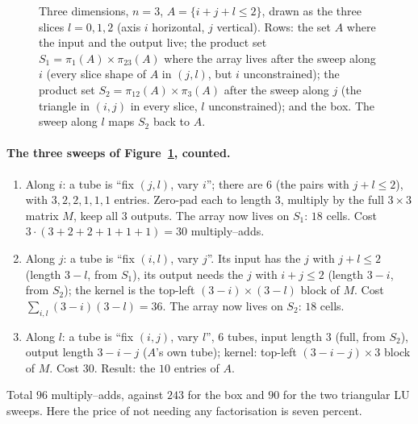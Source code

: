 \documentclass[11pt]{article}
\newcommand{\pr}[1]{\pi_{#1}}
\begin{document}
\begin{figure}[ht]
\caption{Three dimensions, $n=3$, $A=\{i+j+l\le2\}$, drawn as the three slices $l=0,1,2$ (axis $i$ horizontal, $j$ vertical).
Rows: the set $A$ where the input and the output live; the product set $S_1=\pr{1}(A)\times\pr{23}(A)$ where the array lives
after the sweep along $i$ (every slice shape of $A$ in $(j,l)$, but $i$ unconstrained); the product set
$S_2=\pr{12}(A)\times\pr{3}(A)$ after the sweep along $j$ (the triangle in $(i,j)$ in every slice, $l$ unconstrained); and the box.
The sweep along $l$ maps $S_2$ back to $A$.}\label{fig:3d}
\end{figure}

\paragraph{The three sweeps of Figure~\ref{fig:3d}, counted.}
\begin{enumerate}
\item Along $i$: a tube is ``fix $(j,l)$, vary $i$''; there are $6$ (the pairs with $j+l\le2$), with $3,2,2,1,1,1$ entries. Zero-pad
      each to length $3$, multiply by the full $3\times3$ matrix $M$, keep all $3$ outputs. The array now lives on $S_1$: $18$ cells.
      Cost $3\cdot(3+2+2+1+1+1)=30$ multiply--adds.
\item Along $j$: a tube is ``fix $(i,l)$, vary $j$''. Its input has the $j$ with $j+l\le2$ (length $3-l$, from $S_1$), its output
      needs the $j$ with $i+j\le2$ (length $3-i$, from $S_2$); the kernel is the top-left $(3-i)\times(3-l)$ block of $M$.
      Cost $\sum_{i,l}(3-i)(3-l)=36$. The array now lives on $S_2$: $18$ cells.
\item Along $l$: a tube is ``fix $(i,j)$, vary $l$'', $6$ tubes, input length $3$ (full, from $S_2$), output length $3-i-j$ ($A$'s own
      tube); kernel: top-left $(3-i-j)\times3$ block of $M$. Cost $30$. Result: the $10$ entries of $A$.
\end{enumerate}
Total $96$ multiply--adds, against $243$ for the box and $90$ for the two triangular LU sweeps. Here the price of not
needing any factorisation is seven percent.
\end{document}
